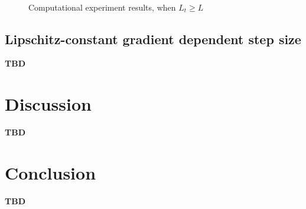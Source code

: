 \documentclass[runningheads, final]{llncs}
\begin{document}
\begin{figure}[h]\label{fig:convergence_rate_case_Lt_qt_L}
    \begin{center}
        { \hspace*{\fill} \\}
    \end{center}
    \caption{Computational experiment results, when $L_t \geqslant L$}
\end{figure}

\subsection{Lipschitz-constant gradient dependent step size}
\textbf{TBD}

\section{Discussion}\label{sec:discussion}
\textbf{TBD}


\section{Conclusion}\label{sec:conclusion}
\textbf{TBD}
\end{document}
